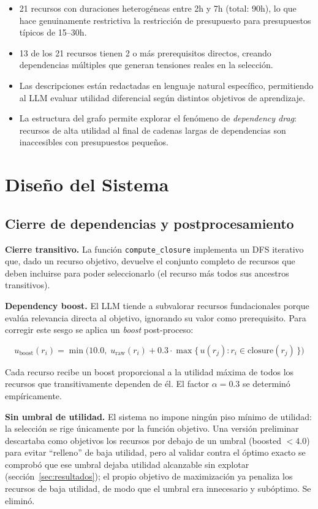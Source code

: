 \documentclass[11pt, a4paper]{article}
\begin{document}
\begin{itemize}[leftmargin=1.5em]
  \item 21 recursos con duraciones heterogéneas entre 2h y 7h (total: 90h), lo que hace genuinamente restrictiva la restricción de presupuesto para presupuestos típicos de 15–30h.
  \item 13 de los 21 recursos tienen 2 o más prerequisitos directos, creando dependencias múltiples que generan tensiones reales en la selección.
  \item Las descripciones están redactadas en lenguaje natural específico, permitiendo al LLM evaluar utilidad diferencial según distintos objetivos de aprendizaje.
  \item La estructura del grafo permite explorar el fenómeno de \emph{dependency drag}: recursos de alta utilidad al final de cadenas largas de dependencias son inaccesibles con presupuestos pequeños.
\end{itemize}

\section{Diseño del Sistema}

\subsection{Cierre de dependencias y postprocesamiento}

\textbf{Cierre transitivo.} La función \texttt{compute\_closure} implementa un DFS iterativo que, dado un recurso objetivo, devuelve el conjunto completo de recursos que deben incluirse para poder seleccionarlo (el recurso más todos sus ancestros transitivos).

\textbf{Dependency boost.} El LLM tiende a subvalorar recursos fundacionales porque evalúa relevancia directa al objetivo, ignorando su valor como prerequisito. Para corregir este sesgo se aplica un \emph{boost} post-proceso:

\[
u_{\text{boost}}(r_i) = \min\!\Big(10.0,\; u_{\text{raw}}(r_i) + 0.3 \cdot \max\{\, u(r_j) : r_i \in \mathrm{closure}(r_j) \,\}\Big)
\]

Cada recurso recibe un boost proporcional a la utilidad máxima de todos los recursos que transitivamente dependen de él. El factor $\alpha = 0.3$ se determinó empíricamente.

\textbf{Sin umbral de utilidad.} El sistema no impone ningún piso mínimo de utilidad: la selección se rige únicamente por la función objetivo. Una versión preliminar descartaba como objetivos los recursos por debajo de un umbral (boosted $<4.0$) para evitar ``relleno'' de baja utilidad, pero al validar contra el óptimo exacto se comprobó que ese umbral dejaba utilidad alcanzable sin explotar (sección~\ref{sec:resultados}); el propio objetivo de maximización ya penaliza los recursos de baja utilidad, de modo que el umbral era innecesario y subóptimo. Se eliminó.
\end{document}
